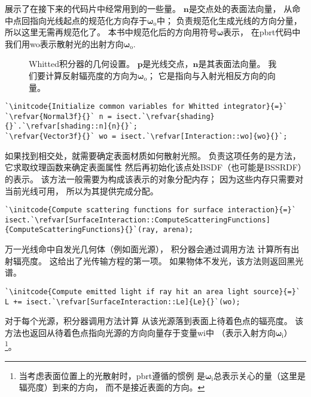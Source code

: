 展示了在接下来的代码片中经常用到的一些量。
$\bm n$是交点处的表面法向量，
从命中点回指向光线起点的规范化方向存于${\bm \omega}_\mathrm{o}$中；
\protect{}负责规范化生成光线的方向分量，
所以这里无需再规范化了。
本书中规范化后的方向用符号$\bm \omega$表示，
在pbrt代码中我们用{\ttfamily wo}表示散射光的出射方向${\bm \omega}_\mathrm{o}$.
\begin{figure}[htbp]
    \centering
    \caption{Whitted积分器的几何设置。
        $\bm p$是光线交点，$\bm n$是其表面法向量。
        我们要计算反射辐亮度的方向为${\bm \omega}_\mathrm{o}$；
        它是指向与入射光相反方向的向量。}
    \label{fig:1.20}
\end{figure}
\begin{lstlisting}
`\initcode{Initialize common variables for Whitted integrator}{=}`
`\refvar{Normal3f}{}` n = isect.`\refvar{shading}{}`.`\refvar[shading::n]{n}{}`;
`\refvar{Vector3f}{}` wo = isect.`\refvar[Interaction::wo]{wo}{}`;
\end{lstlisting}

如果找到相交处，就需要确定表面材质如何散射光照。
负责这项任务的是方法，
它求取纹理函数来确定表面属性
然后再初始化该点处BSDF（也可能是BSSRDF）的表示。
该方法一般需要为构成该表示的对象分配内存；
因为这些内存只需要对当前光线可用，
所以为其提供完成分配。
\begin{lstlisting}
`\initcode{Compute scattering functions for surface interaction}{=}`
isect.`\refvar[SurfaceInteraction::ComputeScatteringFunctions]{ComputeScatteringFunctions}{}`(ray, arena);
\end{lstlisting}

万一光线命中自发光几何体（例如面光源），
积分器会通过调用方法
计算所有出射辐亮度。
这给出了光传输方程的第一项。
如果物体不发光，该方法则返回黑光谱。
\begin{lstlisting}
`\initcode{Compute emitted light if ray hit an area light source}{=}`
L += isect.`\refvar[SurfaceInteraction::Le]{Le}{}`(wo);
\end{lstlisting}

对于每个光源，积分器调用方法计算
从该光源落到表面上待着色点的辐亮度。
该方法也返回从待着色点指向光源的方向向量存于变量{\ttfamily wi}中
（表示入射方向${\bm \omega}_\mathrm{i}$）
\footnote{当考虑表面位置上的光散射时，pbrt遵循的惯例
    是${\bm \omega}_\mathrm{i}$总表示关心的量（这里是辐亮度）到来的方向，
    而不是接近表面的方向。}。



